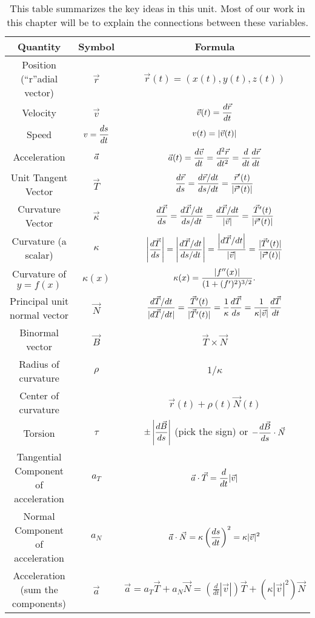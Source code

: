 \begin{table}
\begin{center}
\begin{tabular}{|c|c|c|}
\hline
Quantity & Symbol & Formula\\\hline\hline
Position (``r''adial vector) & $\vec r$ & $\vec r(t) = (x(t),y(t),z(t))$\\\hline
Velocity  & $\vec v$ & $\displaystyle \vec v(t) = \frac{d\vec r}{dt}$\\\hline
Speed  & $v = \displaystyle\frac{ds}{dt}$ & $\displaystyle v(t) = |\vec v(t)|$\\\hline
Acceleration  & $\displaystyle \vec a$ & $\displaystyle \vec a(t) = \frac{d \vec v}{dt}= \frac{d^2\vec r}{dt^2}= \frac{d}{dt}\frac{d\vec r}{dt}$\\\hline
Unit Tangent Vector & $\vec T$ & $\displaystyle\frac{d\vec r}{ds} = \frac{d\vec r/dt}{ds/dt} = \frac{\vec r^\prime(t)}{|\vec r^\prime(t)|}$\\\hline
Curvature Vector & $\vec \kappa $& $\displaystyle\frac{d\vec T}{ds} =\frac{d\vec T/dt}{ds/dt} = \frac{d\vec T/dt}{|\vec v|} = \frac{\vec T^\prime(t)}{|\vec r^\prime(t)|} $\\\hline
Curvature (a scalar)& $ \kappa $&$\displaystyle \left|\frac{d\vec T}{ds}\right| =\left|\frac{d\vec T/dt}{ds/dt}\right| = \frac{\left|d\vec T/dt\right|}{|\vec v|}= \frac{|\vec T^\prime(t)|}{|\vec r^\prime(t)|}  $ \\\hline
Curvature of $y=f(x)$& $ \kappa(x) $&$\displaystyle \kappa(x) = \frac{|f''(x)|}{(1+(f')^2)^{3/2}}.  $ \\\hline
Principal unit normal vector & $ \vec N$& $\displaystyle \frac{d\vec T/dt}{|d\vec T/dt|} =  \frac{\vec T^\prime(t)}{|\vec T^\prime(t)|}=\frac{1}{\kappa}\frac{d\vec T}{ds} = \frac{1}{\kappa |\vec v|}\frac{d\vec T}{dt}$\\\hline
Binormal vector & $ \vec B$& $ \vec T\times\vec N$\\\hline
Radius of curvature & $ \rho$ & $1/\kappa$\\\hline
Center of curvature &  & $\vec r(t)+\rho(t)\vec N(t)$ \\\hline
Torsion & $ \tau $ & $\displaystyle \pm\left|\frac{d\vec B}{ds}\right|$ (pick the sign) or $\displaystyle-\frac{d\vec B}{ds}\cdot \vec N $\\\hline
Tangential Component of acceleration & $ a_T$ & $\displaystyle \vec a \cdot \vec T = \frac{d}{dt}|\vec v|$\\\hline
Normal Component of acceleration & $ a_N$ & $\displaystyle \vec a \cdot \vec N = \kappa \left(\frac{ds}{dt}\right)^2 = \kappa |\vec v|^2$\\\hline
Acceleration (sum the components)& $ \vec a$ & 
$\vec a 
= a_T\vec T+a_N\vec N 
= \left(\frac{d}{dt}|\vec v|\right) \vec T 
 +\left(\kappa |\vec v|^2\right) \vec N  $\\\hline


\end{tabular}
\caption{This table summarizes the key ideas in this unit. Most of our work in this chapter will be to explain the connections between these variables.\label{motion table}} 
\end{center}
\end{table}


